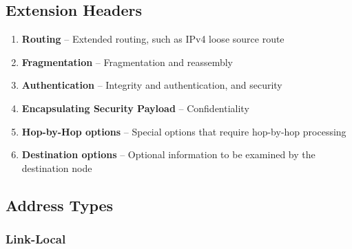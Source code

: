 \subsection[EH]{Extension Headers}\cite{IPv6Pack77:online}

\begin{enumerate}
    \item \textbf{Routing} -- Extended routing, such as IPv4 loose source route
    \item \textbf{Fragmentation} -- Fragmentation and reassembly
    \item \textbf{Authentication} -- Integrity and authentication, and security
    \item \textbf{Encapsulating Security Payload} -- Confidentiality
    \item \textbf{Hop-by-Hop options} -- Special options that require hop-by-hop processing
    \item \textbf{Destination options} -- Optional information to be examined by the destination node
\end{enumerate}

\subsection{Address Types}

\subsubsection{Link-Local}

